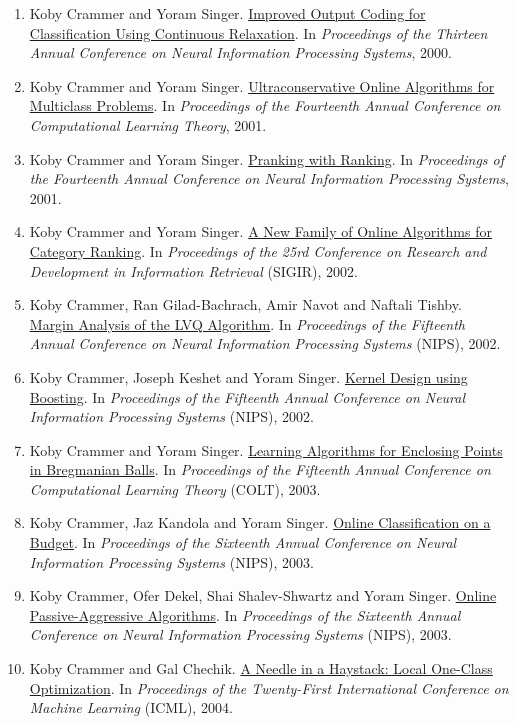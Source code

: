 \documentclass{resume}
\begin{document}
\begin{enumerate}
\item
{Koby Crammer} and Yoram Singer.
\href{http://www.cis.upenn.edu/~crammer/publications/nips00.pdf}{Improved Output Coding for Classification Using Continuous Relaxation}.
In {\em Proceedings of the Thirteen Annual Conference on Neural Information Processing Systems}, 2000.
\item
{Koby Crammer} and Yoram Singer.
\href{http://www.cis.upenn.edu/~crammer/publications/colt01.ps}{Ultraconservative Online Algorithms for Multiclass Problems}.
In {\em Proceedings of the  Fourteenth Annual Conference on Computational Learning Theory}, 2001.
\item
{Koby Crammer} and Yoram Singer.
\href{http://www.cis.upenn.edu/~crammer/publications/nips01.ps}{Pranking with Ranking}.
In {\em Proceedings of the Fourteenth Annual Conference on Neural Information Processing Systems}, 2001.
\item
{Koby Crammer} and Yoram Singer.
\href{http://www.cis.upenn.edu/~crammer/publications/sigir02.ps}{A New Family of Online Algorithms for Category Ranking}.
In {\em Proceedings of the 25rd Conference on Research and Development in Information Retrieval} (SIGIR),
2002.
\item
{Koby Crammer}, Ran Gilad-Bachrach, Amir Navot and Naftali Tishby.
\href{http://www.cis.upenn.edu/~crammer/publications/nips02b.pdf}{Margin Analysis of the LVQ Algorithm}.
In {\em Proceedings of the Fifteenth Annual Conference on Neural Information Processing Systems} (NIPS),
2002.
\item
{Koby Crammer}, Joseph Keshet and Yoram Singer.
\href{http://www.cis.upenn.edu/~crammer/publications/nips02a.pdf}{Kernel Design using Boosting}.
In {\em Proceedings of the Fifteenth Annual Conference on Neural Information Processing Systems} (NIPS),
2002.
\item
{Koby Crammer} and Yoram Singer.
\href{http://www.cis.upenn.edu/~crammer/publications/colt03.ps}{Learning Algorithms for Enclosing Points in Bregmanian Balls}.
In {\em Proceedings of the Fifteenth Annual Conference on Computational Learning Theory} (COLT), 2003.
\item {Koby Crammer}, Jaz Kandola and Yoram Singer.
\href{http://www.cis.upenn.edu/~crammer/publications/budget-nips03.pdf}{Online Classification on a Budget}.
In {\em Proceedings of the Sixteenth Annual Conference on Neural Information Processing Systems} (NIPS), 2003.
\item {Koby Crammer}, Ofer Dekel, Shai Shalev-Shwartz and Yoram Singer.
\href{http://www.cis.upenn.edu/~crammer/publications/passiveAggressive-nips03b.pdf}{Online Passive-Aggressive Algorithms}.
In {\em Proceedings of the Sixteenth Annual Conference on Neural Information Processing Systems} (NIPS), 2003.
\item
{Koby Crammer} and Gal Chechik.
\href{http://www.cis.upenn.edu/~crammer/publications/ocibn-icml04.pdf}{A Needle in a Haystack: Local One-Class Optimization}.
In {\em Proceedings of the Twenty-First International Conference on
  Machine Learning} (ICML), 2004.


\end{enumerate}
\end{document}
